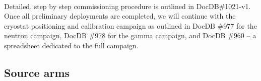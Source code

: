  \paragraph{}
  Detailed, step by step commissioning procedure is outlined in DocDB\#1021-v1. 
Once all preliminary deployments are completed, we will continue with the cryostat positioning and calibration campaign as outlined in DocDB \#977 for the neutron campaign, DocDB \#978 for the gamma campaign, and DocDB \#960 -- a spreadsheet dedicated to the full campaign.  




\subsection{Source arms}



